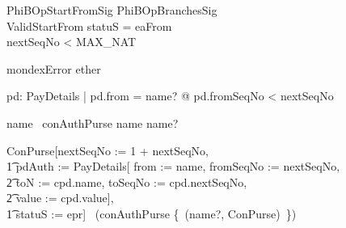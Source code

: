 \begin{LNewSDef}
\begin{schema}{PhiBOpStartFromSig}
    PhiBOpBranchesSig \\
    ValidStartFrom
\where
    statuS = eaFrom \\
    nextSeqNo < MAX\_NAT
    \also

    mondexError \in ether
    \also

    \forall pd: PayDetails | pd.from = name? @ pd.fromSeqNo < nextSeqNo
    \also

    name \in \dom~conAuthPurse \implies name \neq name?
    \also

    \lnot \theta ConPurse[nextSeqNo := 1 + nextSeqNo, \\
        \t1 pdAuth := \theta PayDetails[
            from := name, fromSeqNo := nextSeqNo,\\
            \t2 toN := cpd.name, toSeqNo := cpd.nextSeqNo, \\
            \t2 value := cpd.value], \\
        \t1 statuS := epr] \in \ran~(conAuthPurse \oplus \{~(name?, \theta ConPurse)~\})
\end{schema}~\end{LNewSDef}

\newpage

